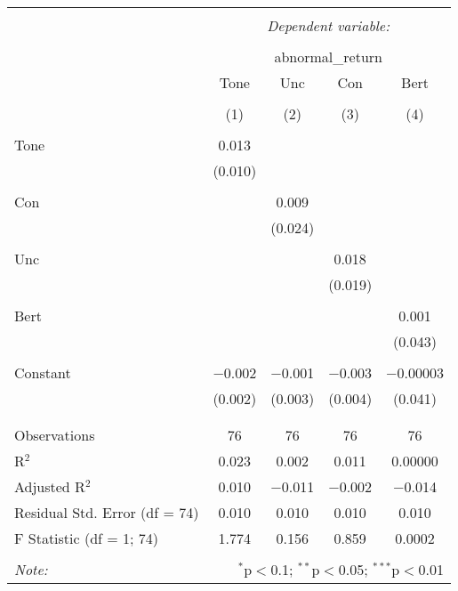 \documentclass[
]{article}
\begin{document}
\begin{table}[!htbp] \centering 
  \caption{} 
  \label{} 
\begin{tabular}{@{\extracolsep{5pt}}lcccc} 
\\[-1.8ex]\hline 
\hline \\[-1.8ex] 
 & \multicolumn{4}{c}{\textit{Dependent variable:}} \\ 
\cline{2-5} 
\\[-1.8ex] & \multicolumn{4}{c}{abnormal\_return} \\ 
 & Tone & Unc & Con & Bert \\ 
\\[-1.8ex] & (1) & (2) & (3) & (4)\\ 
\hline \\[-1.8ex] 
 Tone & 0.013 &  &  &  \\ 
  & (0.010) &  &  &  \\ 
  & & & & \\ 
 Con &  & 0.009 &  &  \\ 
  &  & (0.024) &  &  \\ 
  & & & & \\ 
 Unc &  &  & 0.018 &  \\ 
  &  &  & (0.019) &  \\ 
  & & & & \\ 
 Bert &  &  &  & 0.001 \\ 
  &  &  &  & (0.043) \\ 
  & & & & \\ 
 Constant & $-$0.002 & $-$0.001 & $-$0.003 & $-$0.00003 \\ 
  & (0.002) & (0.003) & (0.004) & (0.041) \\ 
  & & & & \\ 
\hline \\[-1.8ex] 
Observations & 76 & 76 & 76 & 76 \\ 
R$^{2}$ & 0.023 & 0.002 & 0.011 & 0.00000 \\ 
Adjusted R$^{2}$ & 0.010 & $-$0.011 & $-$0.002 & $-$0.014 \\ 
Residual Std. Error (df = 74) & 0.010 & 0.010 & 0.010 & 0.010 \\ 
F Statistic (df = 1; 74) & 1.774 & 0.156 & 0.859 & 0.0002 \\ 
\hline 
\hline \\[-1.8ex] 
\textit{Note:}  & \multicolumn{4}{r}{$^{*}$p$<$0.1; $^{**}$p$<$0.05; $^{***}$p$<$0.01} \\ 
\end{tabular} 
\end{table}
\end{document}
